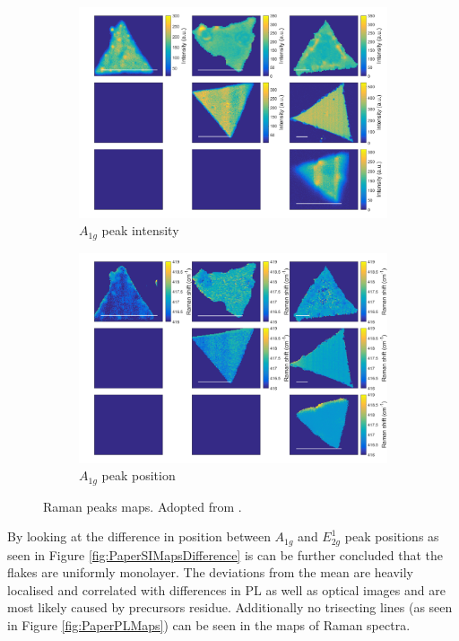 \begin{figure}[H]
\begin{center}
\begin{subfigure}[b]{0.4\textwidth}
			\includegraphics[width=\textwidth]{PaperSIMapsIntensityA.png}
			\caption{$A_{1g}$ peak intensity}
			\label{fig:PaperSIMapsIntensityA}
		\end{subfigure}
		\quad
		\begin{subfigure}[b]{0.4\textwidth}
			\includegraphics[width=\textwidth]{PaperSIMapsPositionA.png}
			\caption{$A_{1g}$ peak position}
			\label{fig:PaperSIMapsPositionA}
		\end{subfigure}
		\caption{Raman peaks maps. Adopted from \cite{Reale2017}.}
		\label{fig:PaperSIMapsRaman}
	\end{center}
\end{figure}

By looking at the difference in position between $A_{1g}$ and $E^1_{2g}$ peak positions as seen in Figure \ref{fig:PaperSIMapsDifference} is can be further concluded that the flakes are uniformly monolayer. The deviations from the mean are heavily localised and correlated with differences in PL as well as optical images and are most likely caused by precursors residue. Additionally no trisecting lines (as seen in Figure \ref{fig:PaperPLMaps}) can be seen in the maps of Raman spectra.

